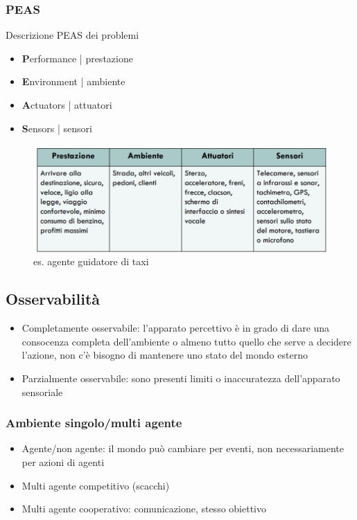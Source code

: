 \documentclass{article}
\begin{document}
\subsubsection{PEAS}
Descrizione PEAS dei problemi
\begin{itemize}
    \item \textbf{P}erformance | prestazione
    \item \textbf{E}nvironment | ambiente
    \item \textbf{A}ctuators | attuatori
    \item \textbf{S}ensors | sensori
\end{itemize}
\begin{figure}
    \centering
    \includegraphics[width=\linewidth]{8.png}
    \caption{es. agente guidatore di taxi}
\end{figure}

\subsection{Osservabilità}
\begin{itemize}
    \item Completamente osservabile: l'apparato percettivo è in grado di dare una consocenza completa dell'ambiente o almeno tutto quello che serve a decidere l'azione, non c'è bisogno di mantenere uno stato del mondo esterno
    \item Parzialmente osservabile: sono presenti limiti o inaccuratezza dell'apparato sensoriale
\end{itemize}
\subsubsection{Ambiente singolo/multi agente}
\begin{itemize}
    \item Agente/non agente: il mondo può cambiare per eventi, non necessariamente per azioni di agenti
    \item Multi agente competitivo (scacchi)
    \item Multi agente cooperativo: comunicazione, stesso obiettivo
\end{itemize}
\end{document}
